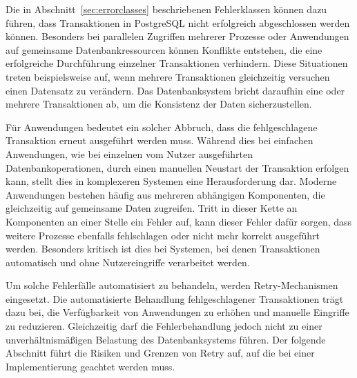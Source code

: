 
Die in Abschnitt~\ref{sec:errorclasses} beschriebenen Fehlerklassen können dazu führen, dass Transaktionen in
PostgreSQL nicht erfolgreich abgeschlossen werden können.
Besonders bei parallelen Zugriffen mehrerer Prozesse oder Anwendungen auf gemeinsame Datenbankressourcen können
Konflikte entstehen, die eine erfolgreiche Durchführung einzelner Transaktionen verhindern.
Diese Situationen treten beispielsweise auf, wenn mehrere Transaktionen gleichzeitig versuchen einen Datensatz zu
verändern.
Das Datenbanksystem bricht daraufhin eine oder mehrere Transaktionen ab, um die Konsistenz der Daten sicherzustellen.

Für Anwendungen bedeutet ein solcher Abbruch, dass die fehlgeschlagene Transaktion erneut ausgeführt werden muss.
Während dies bei einfachen Anwendungen, wie bei einzelnen vom Nutzer ausgeführten Datenbankoperationen, durch einen
manuellen Neustart der Transaktion erfolgen kann, stellt dies in komplexeren Systemen eine Herausforderung dar.
Moderne Anwendungen bestehen häufig aus mehreren abhängigen Komponenten, die gleichzeitig auf gemeinsame Daten
zugreifen.
Tritt in dieser Kette an Komponenten an einer Stelle ein Fehler auf, kann dieser Fehler dafür sorgen, dass weitere
Prozesse ebenfalls fehlschlagen oder nicht mehr korrekt ausgeführt werden.
Besonders kritisch ist dies bei Systemen, bei denen Transaktionen automatisch und ohne Nutzereingriffe verarbeitet
werden.

Um solche Fehlerfälle automatisiert zu behandeln, werden Retry-Mechanismen eingesetzt.
Die automatisierte Behandlung fehlgeschlagener Transaktionen trägt dazu bei, die Verfügbarkeit von Anwendungen zu
erhöhen und manuelle Eingriffe zu reduzieren.
Gleichzeitig darf die Fehlerbehandlung jedoch nicht zu einer unverhältnismäßigen Belastung des Datenbanksystems
führen.
Der folgende Abschnitt führt die Risiken und Grenzen von Retry auf, auf die bei einer Implementierung geachtet
werden muss.
